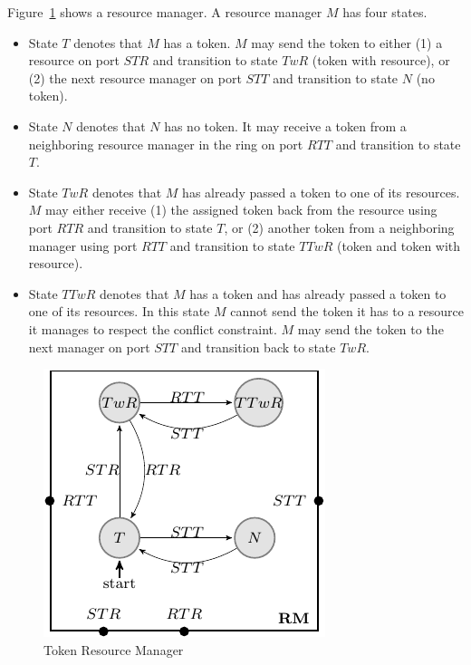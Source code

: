 Figure~\ref{fig:conflict-token} shows a resource manager.
A resource manager $M$ has four states. 
\begin{itemize}
  \item State $T$ denotes that $M$ has a token. $M$ may send the token to either 
    (1) a resource on port $STR$ and transition to state $TwR$ (token with resource), or 
    (2) the next resource manager on port $STT$ and transition to state $N$ (no token).
  \item State $N$ denotes that $N$ has no token. 
    It may receive a token from a neighboring resource manager in the ring on port $RTT$ 
    and transition to state $T$. 
  \item State $TwR$ denotes that $M$ has already passed a token to one of its resources. 
    $M$ may either receive (1) the assigned token back from the resource using port $RTR$ and transition to state $T$, 
    or (2) another token from a neighboring manager using port $RTT$ and transition to state $TTwR$ (token and token with resource).
  \item State $TTwR$ denotes that $M$ has a token and has already passed a token to one of its resources. 
    In this state $M$ cannot send the token it has to a resource it manages to respect the conflict constraint. 
    $M$ may send the token to the next manager on port $STT$ and transition back to state $TwR$. 
\end{itemize}

\begin{figure}[H]
\begin{center}
\includegraphics[scale=1.2]{compiledfigures/token-crop.pdf}
\caption{Token Resource Manager}
\label{fig:conflict-token}
\end{center}
\end{figure}

